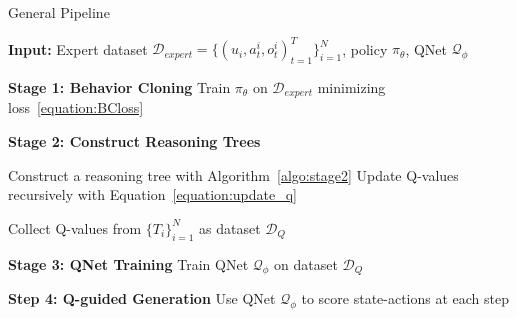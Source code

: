 \begin{algorithm}[tb]
\caption{General {\ours} Pipeline}
\label{algo:pipeline}
\begin{algorithmic}
\STATE \textbf{Input:} Expert dataset $\mathcal{D}_{expert} = \{(u_i, a^i_t,o^i_t)_{t=1}^T\}_{i=1}^{N}$, policy $\pi_\theta$, QNet $\mathcal{Q}_{\phi}$
   
   \STATE \textbf{Stage 1: Behavior Cloning}
   \STATE Train $\pi_\theta$ on $\mathcal{D}_{expert}$ minimizing loss~\ref{equation:BCloss} 
   
   \STATE \textbf{Stage 2: Construct Reasoning Trees}
   
     \STATE Construct a reasoning tree with Algorithm~\ref{algo:stage2}
     \STATE Update Q-values recursively with Equation~\ref{equation:update_q}
   \ENDFOR
   
   \STATE Collect Q-values from $\{T_i\}_{i=1}^N$ as dataset $\mathcal{D}_Q$
   
   \STATE \textbf{Stage 3: QNet Training}
   \STATE Train QNet $\mathcal{Q}_{\phi}$ on dataset $\mathcal{D}_Q$
   
   \STATE \textbf{Step 4: Q-guided Generation}
   \STATE Use QNet $\mathcal{Q}_{\phi}$ to score state-actions at each step
\end{algorithmic}
\end{algorithm}
